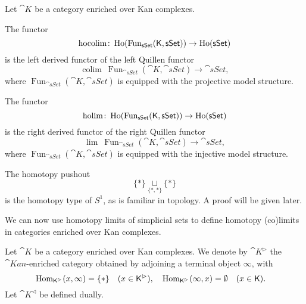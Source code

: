 \begin{definition}
    Let $\cat K$ be a category enriched over Kan complexes.
    \begin{itms}
        \item The  functor
        \[ \operatorname{hocolim}\colon\operatorname{Ho}(\operatorname{Fun}_{\mathsf{sSet}}(\mathsf{K},\mathsf{sSet}))\to\operatorname{Ho}(\mathsf{sSet}) \]
        is the left derived functor of the left Quillen functor 
        \[ \operatorname{colim}\:\operatorname{Fun}_{\cat{sSet}}(\cat K,\cat{sSet})\to\cat{sSet}, \]
        where $\operatorname{Fun}_{\cat{sSet}}(\cat K,\cat{sSet})$
        is equipped with the projective model structure.

        \item The  functor
        \[ \operatorname{holim}\colon\operatorname{Ho}(\operatorname{Fun}_{\mathsf{sSet}}(\mathsf{K},\mathsf{sSet}))\to\operatorname{Ho}(\mathsf{sSet}) \]
        is the right derived functor of the right Quillen functor 
        \[ \operatorname{lim}\:\operatorname{Fun}_{\cat{sSet}}(\cat K,\cat{sSet})\to\cat{sSet}, \]
        where $\operatorname{Fun}_{\cat{sSet}}(\cat K,\cat{sSet})$
        is equipped with the injective model structure.
    \end{itms}
\end{definition}

\begin{example}
    The homotopy pushout
    \[ \{*\}\underset{\{*,*\}}{\sqcup}\{*\} \]
    is the homotopy type of $S^1$, as is familiar in topology.
    A proof will be given later.
    \varqed
\end{example}

We can now use homotopy limits of simplicial sets 
to define homotopy (co)limits in categories enriched over Kan complexes.

Let $\cat K$ be a category enriched over Kan complexes.
We denote by $\cat K^\vartriangleright$ the $\cat{Kan}$-enriched category obtained
by adjoining a terminal object $\infty$, with 
\[ \operatorname{Hom}_{\mathsf{K}^\vartriangleright}(x,\infty)=\{*\}\quad(x\in\mathsf{K}^\vartriangleright),\quad
\operatorname{Hom}_{\mathsf{K}^\vartriangleright}(\infty,x)=\emptyset\quad(x\in\mathsf{K}).\quad  \]
Let $\cat K^\vartriangleleft$ be defined dually.

